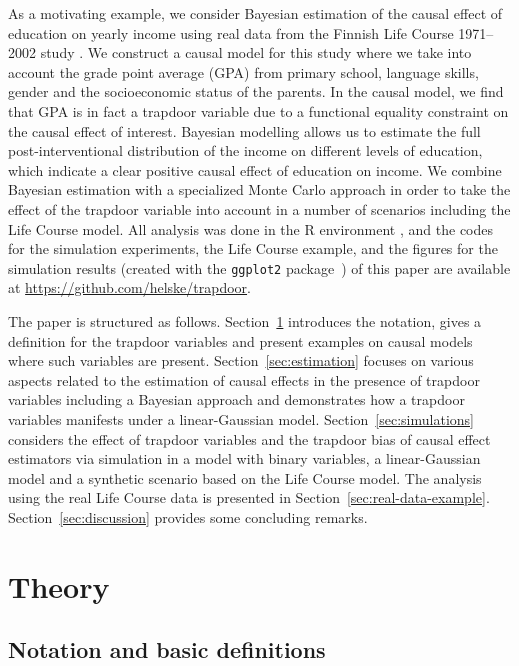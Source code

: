 \documentclass[11pt,a4paper,twoside]{article}
\newcommand{\+}[1]{\ensuremath{\mathbf{#1}}}
\begin{document}
	As a motivating example, we consider Bayesian estimation of the causal effect of education on yearly income using real data from the Finnish Life Course 1971--2002 study \citep{fsd}. We construct a causal model for this study where we take into account the grade point average (GPA) from primary school, language skills, gender and the socioeconomic status of the parents. In the causal model, we find that GPA is in fact a trapdoor variable due to a functional equality constraint on the causal effect of interest. Bayesian modelling allows us to estimate the full post-interventional distribution of the income on different levels of education, which indicate a clear positive causal effect of education on income.
	We combine Bayesian estimation with a specialized Monte Carlo approach in order to take the effect of the trapdoor variable into account in a number of scenarios including the Life Course model. All analysis was done in the R environment \citep{R}, and the codes for the simulation experiments, the Life Course example, and the figures for the simulation results (created with the \texttt{ggplot2} package~\citep{ggplot2}) of this paper are available at \url{https://github.com/helske/trapdoor}.

	The paper is structured as follows. Section~\ref{sec:theory} introduces the notation, gives a definition for the trapdoor variables and present examples on causal models where such variables are present. Section~\ref{sec:estimation} focuses on various aspects related to the estimation of causal effects in the presence of trapdoor variables including a Bayesian approach and demonstrates how a trapdoor variables manifests under a linear-Gaussian model. Section~\ref{sec:simulations} considers the effect of trapdoor variables and the trapdoor bias of causal effect estimators via simulation in a model with binary variables, a linear-Gaussian model and a synthetic scenario based on the Life Course model. The analysis using the real Life Course data is presented in Section~\ref{sec:real-data-example}. Section~\ref{sec:discussion} provides some concluding remarks.
	
\section{Theory}
\label{sec:theory}
	
\subsection{Notation and basic definitions}
\end{document}
